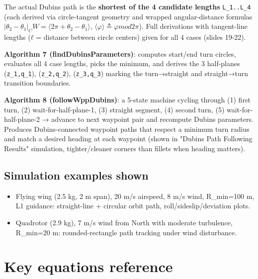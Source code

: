 \documentclass[11pt]{article}
\begin{document}
The actual Dubins path is the \textbf{shortest of the 4 candidate lengths} \texttt{L\_\allowbreak{}1..L\_\allowbreak{}4} (each derived via circle-tangent geometry and wrapped angular-distance formulas $|θ_2-θ_1|_CW = ⟨2π+θ_2-θ_1⟩$, $⟨φ⟩ ≜ φ mod 2π$). Full derivations with tangent-line lengths ($ℓ$ = distance between circle centers) given for all 4 cases (slides 19-22).

\textbf{Algorithm 7 (findDubinsParameters)}: computes start/end turn circles, evaluates all 4 case lengths, picks the minimum, and derives the 3 half-planes (\texttt{z\_\allowbreak{}1,q\_\allowbreak{}1}), (\texttt{z\_\allowbreak{}2,q\_\allowbreak{}2}), (\texttt{z\_\allowbreak{}3,q\_\allowbreak{}3}) marking the turn→straight and straight→turn transition boundaries.

\textbf{Algorithm 8 (followWppDubins)}: a 5-state machine cycling through (1) first turn, (2) wait-for-half-plane-1, (3) straight segment, (4) second turn, (5) wait-for-half-plane-2 → advance to next waypoint pair and recompute Dubins parameters. Produces Dubins-connected waypoint paths that respect a minimum turn radius and match a desired heading at each waypoint (shown in "Dubins Path Following Results" simulation, tighter/cleaner corners than fillets when heading matters).

\subsection{Simulation examples shown}
\begin{itemize}
\item Flying wing (2.5 kg, 2 m span), 20 m/s airspeed, 8 m/s wind, R\_\allowbreak{}min=100 m, L1 guidance: straight-line + circular orbit path, roll/sideslip/deviation plots.
\item Quadrotor (2.9 kg), 7 m/s wind from North with moderate turbulence, R\_\allowbreak{}min=20 m: rounded-rectangle path tracking under wind disturbance.
\end{itemize}

\section{Key equations reference}
\end{document}
